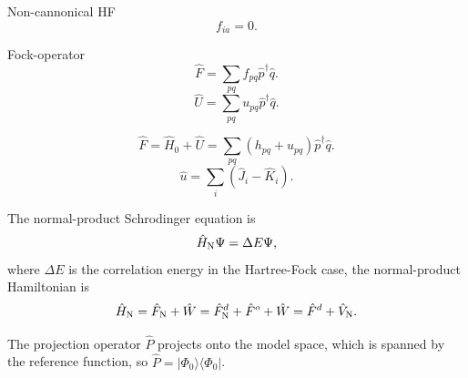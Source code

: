 \documentclass[a4paper, 11pt, notitlepage, english]{article}
\newcommand{\bra}[1]{\langle #1|}
\newcommand{\ket}[1]{|#1 \rangle}
\newcommand{\op}[1]{\hat{#1}}
\begin{document}
Non-cannonical HF
$$f_{ia} = 0.$$

Fock-operator
$$\op{F} = \sum_{pq} f_{pq}\op{p}^\dagger \op{q}.$$
$$\op{U} = \sum_{pq} u_{pq}\op{p}^\dagger \op{q}.$$

$$\op{F} = \op{H}_0 + \op{U} = \sum_{pq} (h_{pq} + u_{pq})\op{p}^\dagger \op{q}.$$
$$\op{u} = \sum_i (\op{J}_i - \op{K}_i).$$

The normal-product Schrodinger equation is
$$\op{H}_{\rm N} \Psi = \Delta E \Psi,$$
where $\Delta E$ is the correlation energy in the Hartree-Fock case, the normal-product Hamiltonian is
$$\op{H}_{\rm N} = \op{F}_{\rm N} + \op{W} = \op{F}^d_{\rm N} + \op{F}^o + \op{W} = \op{F}^d + \op{V}_{\rm N}.$$


The projection operator $\op{P}$ projects onto the model space, which is spanned by the reference function, so $\op{P} = \ket{\Phi_0}\bra{\Phi_0}$.
\end{document}
